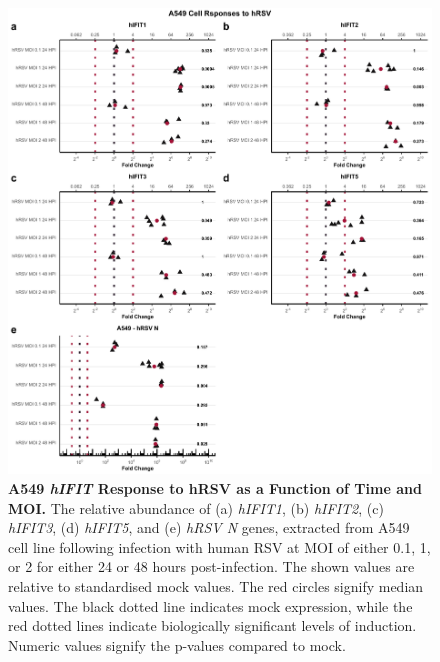 \begin{figure}
    \centering
    \includegraphics[width=1\linewidth]{06. Chapter 1/Figs/01. Induction/05. a549_hrsv_timepoints.pdf}
    \caption[A549 \textit{hIFIT} Response to hRSV as a Function of Time and MOI.]{\textbf{A549 \textit{hIFIT} Response to hRSV as a Function of Time and MOI.} The relative abundance of (a) \textit{hIFIT1}, (b) \textit{hIFIT2}, (c) \textit{hIFIT3}, (d) \textit{hIFIT5}, and (e) \textit{hRSV N} genes, extracted from A549 cell line following infection with human RSV at MOI of either 0.1, 1, or 2 for either 24 or 48 hours post-infection. The shown values are relative to standardised mock values. The red circles signify median values. The black dotted line indicates mock expression, while the red dotted lines indicate biologically significant levels of induction. Numeric values signify the p-values compared to mock.}
    \label{fig:A549 response to hRSV timepoints}
\end{figure}


